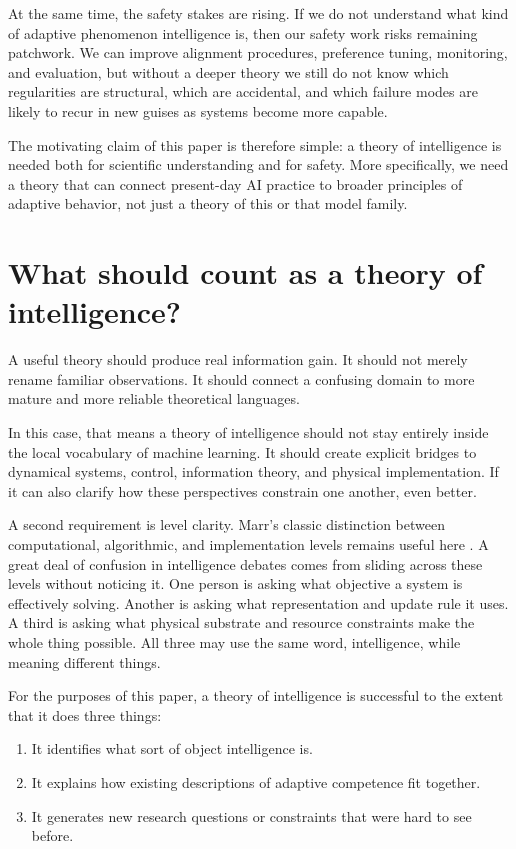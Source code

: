 \documentclass[11pt]{article}
\begin{document}
At the same time, the safety stakes are rising. If we do not understand what kind of adaptive phenomenon intelligence is, then our safety work risks remaining patchwork. We can improve alignment procedures, preference tuning, monitoring, and evaluation, but without a deeper theory we still do not know which regularities are structural, which are accidental, and which failure modes are likely to recur in new guises as systems become more capable.

The motivating claim of this paper is therefore simple: a theory of intelligence is needed both for scientific understanding and for safety. More specifically, we need a theory that can connect present-day AI practice to broader principles of adaptive behavior, not just a theory of this or that model family.

\section{What should count as a theory of intelligence?}


A useful theory should produce real information gain. It should not merely rename familiar observations. It should connect a confusing domain to more mature and more reliable theoretical languages.

In this case, that means a theory of intelligence should not stay entirely inside the local vocabulary of machine learning. It should create explicit bridges to dynamical systems, control, information theory, and physical implementation. If it can also clarify how these perspectives constrain one another, even better.

A second requirement is level clarity. Marr's classic distinction between computational, algorithmic, and implementation levels remains useful here \citep{marr1982}. A great deal of confusion in intelligence debates comes from sliding across these levels without noticing it. One person is asking what objective a system is effectively solving. Another is asking what representation and update rule it uses. A third is asking what physical substrate and resource constraints make the whole thing possible. All three may use the same word, intelligence, while meaning different things.

For the purposes of this paper, a theory of intelligence is successful to the extent that it does three things:

\begin{enumerate}
\item It identifies what sort of object intelligence is.
\item It explains how existing descriptions of adaptive competence fit together.
\item It generates new research questions or constraints that were hard to see before.

\end{enumerate}
\end{document}
